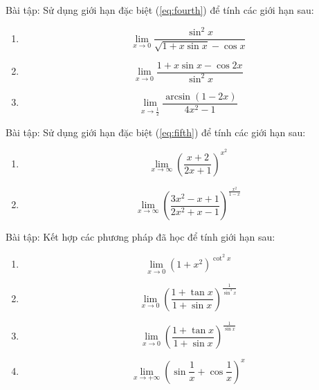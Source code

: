 Bài tập: Sử dụng giới hạn đặc biệt (\ref{eq:fourth}) để tính các giới hạn sau:
\begin{enumerate}
    \item $$\lim_{x\to0}\frac{\sin^2{x}}{\sqrt{1+x\sin{x}}-\cos{x}}$$
    \item $$\lim_{x\to0}\frac{1+x\sin{x}-\cos{2x}}{\sin^2{x}}$$
    \item $$\lim_{x\to\frac{1}{2}}{\frac{\arcsin{(1-2x)}}{4x^2-1}}$$
\end{enumerate}
Bài tập: Sử dụng giới hạn đặc biệt (\ref{eq:fifth}) để tính các giới hạn sau:
\begin{enumerate}
    \item $$\lim_{x\to\infty}\left(\frac{x+2}{2x+1}\right)^{x^2}$$
    \item $$\lim_{x\to\infty}\left(\frac{3x^2-x+1}{2x^2+x-1}\right)^{\frac{x^2}{1-x}}$$
\end{enumerate}
Bài tập: Kết hợp các phương pháp đã học để tính giới hạn sau:
\begin{enumerate}
    \item $$\lim_{x\to0}(1+x^2)^{\cot^2{x}}$$
    \item $$\lim_{x\to0}\left(\frac{1+\tan{x}}{1+\sin{x}}\right)^{\frac{1}{\sin^3{x}}}$$
    \item $$\lim_{x\to0}\left(\frac{1+\tan{x}}{1+\sin{x}}\right)^{\frac{1}{\sin{x}}}$$
    \item $$\lim_{x\to+\infty}\left(\sin{\frac{1}{x}}+\cos{\frac{1}{x}}\right)^x$$
\end{enumerate}


